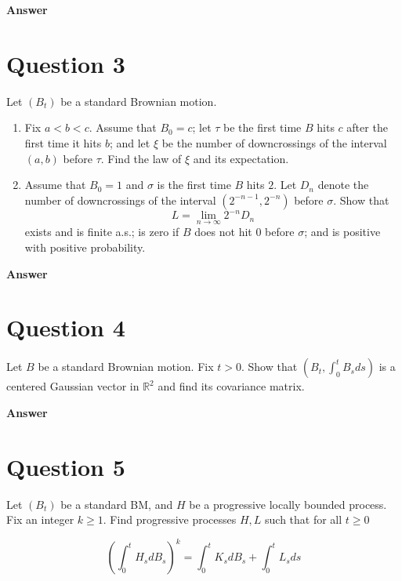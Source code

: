\documentclass[letterpaper]{article}
\begin{document}
		\textbf{Answer}
		
		\clearpage
		
		\section{Question 3}
		
		Let $(B_t)$ be a standard Brownian motion.
		
		\begin{enumerate}
			\item[a.] Fix $a<b<c$. Assume that $B_0=c$; let $\tau$ be the first
			time $B$ hits $c$ after the first time it hits $b$; and let $\xi$ be the number
			of downcrossings of the interval $(a,b)$ before $\tau$. Find the law of $\xi$
			and its expectation.
			
			\item[b.] Assume that $B_0=1$ and $\sigma$ is the first time $B$
			hits $2$. Let $D_n$ denote the number of downcrossings of the interval
			$(2^{-n-1},2^{-n})$ before $\sigma$. Show that
			$$
			L=\lim_{n\to\infty} 2^{-n}D_n
			$$
			exists and is finite a.s.; is zero if $B$ does not hit $0$ before $\sigma$; and
			is positive with positive probability.
		\end{enumerate}
		
		\textbf{Answer}
		
		\clearpage
		
		\section{Question 4}
		
		Let $B$ be a standard Brownian motion. Fix $t>0$. Show that $\left(B_{t}, \int_{0}^{t} B_{s} d s\right)$ is a centered Gaussian vector in $\mathbb{R}^{2}$ and find its covariance matrix.
		
		\textbf{Answer}
		
		\clearpage
		
		\section{Question 5}
		
		Let $\left(B_{t}\right)$ be a standard BM, and $H$ be a progressive locally bounded process. Fix an integer $k \geq 1$. Find progressive processes $H, L$ such that for all $t \geq 0$
		
		$$
		\left(\int_{0}^{t} H_{s} d B_{s}\right)^{k}=\int_{0}^{t} K_{s} d B_{s}+\int_{0}^{t} L_{s} d s
		$$
		
\end{document}
